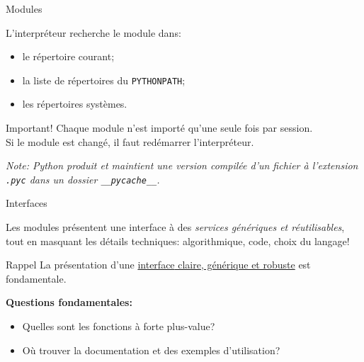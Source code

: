 \documentclass[dvipsnames]{beamer}
\begin{document}
\begin{frame}
    [fragile]{Modules}

    L'interpréteur recherche le module dans:
    \begin{itemize}
        \item le répertoire courant;
        \item la liste de répertoires du \texttt{PYTHONPATH};
        \item les répertoires systèmes.
    \end{itemize}

    \begin{alertblock}
        {Important!}
        \vspace{.5em}
        Chaque module n'est importé \alert{qu'une seule fois} par session.\\Si
        le module est changé, il faut redémarrer l'interpréteur.
    \end{alertblock}

    \vspace{-.5em} {\em Note: Python produit et maintient une version compilée
        d'un fichier à l'extension \texttt{.pyc} dans un dossier
        \verb+__pycache__+.}

\end{frame}

\begin{frame}
    [fragile]{Interfaces}

    Les modules présentent une interface à des \emph{services génériques et
        réutilisables}, tout en masquant les détails techniques: algorithmique,
    code, choix du langage!

    \begin{alertblock}
        {Rappel}
        \vspace{.5em}
        La présentation d'une \alert{\underline{{interface}
                \normalfont\color{black} claire, générique et
                robuste}} est fondamentale.
    \end{alertblock}

    \vspace{-.5em}\textbf{Questions fondamentales:}
    \begin{itemize}
        \item Quelles sont les fonctions à forte plus-value?
        \item Où trouver la documentation et des exemples d'utilisation?
    \end{itemize}
\end{frame}
\end{document}

